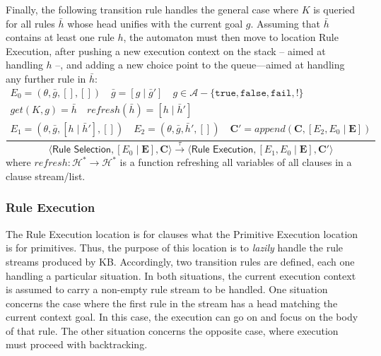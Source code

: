 \documentclass{article}
\newcommand{\stateStyle}[1]{\textsf{#1}}
\newcommand{\state}[1]{\stateStyle{#1}}
\newcommand{\stream}[1]{\bar{#1}}
\newcommand{\vect}[1]{\mathbf{#1}}
\newcommand{\notableset}[1]{\mathcal{#1}}
\newcommand{\f}[1]{\mathit{#1}}
\newcommand{\fx}[2]{\f{#1}(#2)}
\newcommand{\transition}[1]{\xrightarrow{\ #1\ }}
\begin{document}
Finally, the following transition rule handles the general case where $K$ is queried for all rules $\stream{h}$ whose head unifies with the current goal $g$.
%
Assuming that $\stream{h}$ contains at least one rule $h$, the automaton must then move to location \state{Rule Execution}, after pushing a new execution context on the stack -- aimed at handling $h$ --, and adding a new choice point to the queue---aimed at handling any further rule in $\stream{h}$:
%
%
\[
    \frac{
        \begin{array}{c}
            E_0 = (\theta, \stream{g}, [], [])
            \quad
            \stream{g} = [g \mid \stream{g}']
            \quad
            g \in \notableset{A} - \{ \mathtt{true}, \mathtt{false}, \mathtt{fail}, \mathtt{!} \}
            \\
            \fx{get}{K, g} = \stream{h}
            \quad
            \fx{refresh}{\stream{h}} = [h \mid \stream{h}']
            \\
            E_1 = (\theta, \stream{g}, [h \mid \stream{h}'], [])
            \quad
            E_2 = (\theta, \stream{g}, \stream{h}', [])
            \quad
            \vect{C}' = \fx{append}{\vect{C}, [E_2, E_0 \mid \vect{E}]}
        \end{array}
    }{
        \langle \state{Rule Selection}, [E_0 \mid \vect{E}], \vect{C} \rangle
        \transition{\tau}
        \langle \state{Rule Execution}, [E_1, E_0 \mid \vect{E}], \vect{C}' \rangle
    }
\]
%
where $\f{refresh} : \notableset{H}^* \rightarrow \notableset{H}^*$ is a function refreshing all variables of all clauses in a clause stream/list.

\subsubsection{Rule Execution}

The \state{Rule Execution} location is for clauses what the \state{Primitive Execution} location is for primitives.
%
Thus, the purpose of this location is to \emph{lazily} handle the rule streams produced by KB.
%
Accordingly, two transition rules are defined, each one handling a particular situation.
%
In both situations, the current execution context is assumed to carry a non-empty rule stream to be handled.
%
One situation concerns the case where the first rule in the stream has a head matching the current context goal.
%
In this case, the execution can go on and focus on the body of that rule.
%
The other situation concerns the opposite case, where execution must proceed with backtracking.
%
\end{document}
